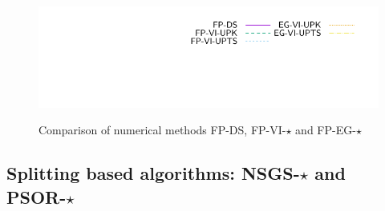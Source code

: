 \begin{figure}[htbp]
 \\
   {\includegraphics[height=\legendheight]{../figure/VI/UpdateRule/1.0e-08/50/time/profile-Chain_legend.pdf}}
   \setlength{\abovecaptionskip}{-40pt}
   \caption{Comparison of numerical methods {\sf FP-DS, FP-VI-$\star$} and {\sf FP-EG-$\star$}}
\label{fig:VI/UpdateRule}
\end{figure}



\subsection{Splitting based algorithms: {\sf NSGS-$\star$} and {\sf PSOR-$\star$}}

